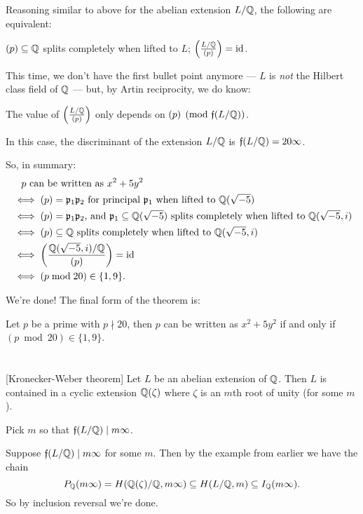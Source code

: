 Reasoning similar to above for the abelian extension $L/\mathbb Q$, the following are equivalent:
\begin{enumerate}
	\ii $(p) \subseteq \mathbb Q$ splits completely when lifted to $L$;
	\ii $\left(\frac{L/\mathbb Q}{(p)}\right) = \mathrm{id}$.
\end{enumerate}

This time, we don't have the first bullet point anymore --- $L$ is \emph{not} the
Hilbert class field of $\mathbb Q$ --- but, by Artin reciprocity, we do know:
\begin{moral}
	The value of $\left(\frac{L/\mathbb Q}{(p)}\right)$ only depends on $(p) \pmod{\mathfrak f(L/\mathbb Q)}$.
\end{moral}
In this case, the discriminant of the extension $L/\mathbb Q$ is $\mathfrak f(L/\mathbb Q) = 20 \infty$.

So, in summary:
\begin{align*}
	&\quad \text{$p$ can be written as $x^2 + 5y^2$} \\
	&\iff \text{$(p) = \mathfrak p_1 \mathfrak p_2$ for principal $\mathfrak p_1$ when lifted to $\mathbb Q(\sqrt{-5})$} \\
	&\iff \text{$(p) = \mathfrak p_1 \mathfrak p_2$, and $\mathfrak p_1 \subseteq \mathbb Q(\sqrt{-5})$ splits completely
		when lifted to $\mathbb Q(\sqrt{-5}, i)$} \\
	&\iff \text{$(p) \subseteq \mathbb Q$ splits completely when lifted to $\mathbb Q(\sqrt{-5}, i)$} \\
	&\iff \left( \frac{\mathbb Q(\sqrt{-5}, i)/\mathbb Q}{(p)} \right) = \mathrm{id} \\
	&\iff (p \bmod 20) \in \{ 1, 9 \}.
\end{align*}

We're done! The final form of the theorem is:
\begin{theorem}
	Let $p$ be a prime with $p \nmid 20$, then $p$ can be written as $x^2 + 5y^2$ if and only if
	$(p \bmod 20) \in \{ 1, 9 \}$.
\end{theorem}


\section{\problemhead}
\begin{dproblem}
	\label{prob:kronecker_weber_theorem}
	[Kronecker-Weber theorem]
	Let $L$ be an abelian extension of $\mathbb Q$.
	Then $L$ is contained in a cyclic extension $\mathbb Q(\zeta)$
	where $\zeta$ is an $m$th root of unity (for some $m$).
	\begin{hint}
		Pick $m$ so that $\mathfrak f(L/\mathbb Q) \mid m\infty$.
	\end{hint}
	\begin{sol}
		Suppose $\mathfrak f(L/\mathbb Q) \mid m\infty$ for some $m$.
		Then by the example from earlier we have the chain
		\[ P_{\mathbb Q}(m\infty) = H(\mathbb Q(\zeta)/\mathbb Q, m\infty)
			\subseteq H(L/\mathbb Q, m) \subseteq I_\mathbb Q(m\infty). \]
		So by inclusion reversal we're done.
	\end{sol}
\end{dproblem}

